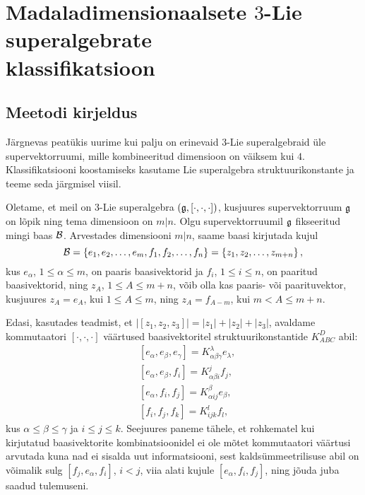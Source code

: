 

\section[Madaladimensionaalsete \texorpdfstring{$3$}{3}-Lie superalgebrate
klassifikatsioon]{Madaladimensionaalsete \texorpdfstring{$3$}{3}-Lie
superalgebrate \\ klassifikatsioon}

\subsection{Meetodi kirjeldus}

Järgnevas peatükis uurime kui palju on erinevaid $3$-Lie superalgebraid üle
supervektorruumi, mille kombineeritud dimensioon on väiksem kui $4$.
Klassifikatsiooni koostamiseks kasutame Lie superalgebra struktuurikonstante
ja teeme seda järgmisel viisil.

Oletame, et meil on 3-Lie superalgebra $(\mathfrak{g}, [\cdot, \cdot, \cdot])$,
kusjuures supervektorruum $\mathfrak{g}$ on lõpik ning tema dimensioon on $m|n$. Olgu
supervektorruumil $\mathfrak{g}$ fikseeritud mingi baas $\mathcal{B}$. Arvestades dimensiooni
$m|n$, saame baasi kirjutada kujul
\[
    \mathcal{B} = \left\{ e_1, e_2, \dots, e_m, f_1, f_2, \dots, f_n \right\} =
         \left\{ z_1, z_2, \dots, z_{m+n} \right\},
\]
kus $e_\alpha$, $1 \leq \alpha \leq m$, on paaris baasivektorid ja
$f_i$, $1 \leq i \leq n$, on paaritud baasivektorid, ning $z_A$,
$1 \leq A \leq m+n$, võib olla kas paaris- või paarituvektor, kusjuures
$z_A = e_A$, kui $1 \leq A \leq m$, ning $z_A = f_{A-m}$, kui
$m < A \leq m+n$.

Edasi, kasutades teadmist, et $|[z_1, z_2, z_3]| = |z_1| + |z_2| + |z_3|$,
avaldame kommutaatori $[\cdot, \cdot, \cdot]$ väärtused baasivektoritel
struktuurikonstantide $K_{ABC}^D$ abil:
\begin{align*}
    &[e_\alpha, e_\beta, e_\gamma] =
        K_{\alpha \beta \gamma}^\lambda e_\lambda, \\
    &[e_\alpha, e_\beta, f_i] = K_{\alpha \beta i}^j f_j, \\
    &[e_\alpha, f_i, f_j] = K_{\alpha i j}^\beta e_\beta, \\
    &[f_i, f_j, f_k] = K_{i j k}^l f_l,
\end{align*}
kus $\alpha \leq \beta \leq \gamma$ ja $i \leq j \leq  k$.
Seejuures paneme tähele, et rohkematel kui kirjutatud baasivektorite
kombinatsioonidel ei ole mõtet kommutaatori väärtusi arvutada kuna nad ei
sisalda uut informatsiooni, sest kaldsümmeetrilisuse abil on võimalik
sulg $[f_j, e_\alpha, f_i]$, $i < j$, viia alati kujule $[e_\alpha, f_i, f_j]$,
ning jõuda juba saadud tulemuseni.

